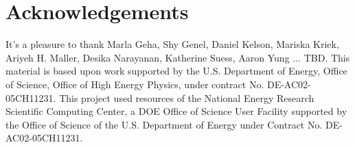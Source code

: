 \documentclass[12pt, letterpaper, preprint, comicneue]{aastex63}
\newcommand{\gr}{g{-}r}
\newcommand{\fnuv}{FUV{-}NUV}
\newcommand{\eda}{EDA}
\newcommand{\ch}[1]{{\color{orange}#1}}
\begin{document}
\begin{abstract}
\end{abstract}



 





\section*{Acknowledgements}
It's a pleasure to thank
    Marla Geha, 
    Shy Genel, 
    Daniel Kelson, 
    Mariska Kriek, 
    Ariyeh H. Maller,
    Desika Narayanan,
    Katherine Suess, 
    Aaron Yung
    ... 
\ch{TBD}.
This material is based upon work supported by the U.S. Department of Energy,
Office of Science, Office of High Energy Physics, under contract No.
DE-AC02-05CH11231.  This project used resources of the National Energy Research
Scientific Computing Center, a DOE Office of Science User Facility supported by
the Office of Science of the U.S.  Department of Energy under Contract No.
DE-AC02-05CH11231. 
\end{document}
